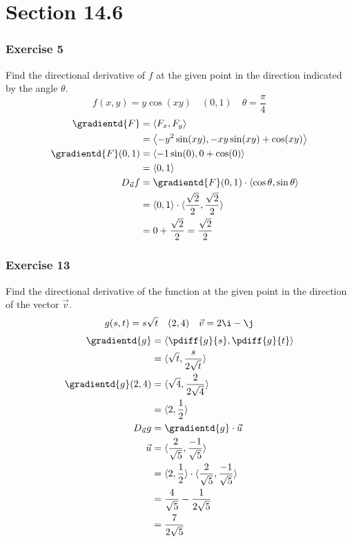 \documentclass{math}
\begin{document}
\section*{Section 14.6}

\subsubsection*{Exercise 5}
Find the directional derivative of \( f \) at the given point in the direction
indicated by the angle \( \theta \).
\[ f(x,y) = y\cos(xy) \quad (0,1) \quad \theta = \frac{\pi}{4} \]
\begin{align*}
  \gradientd{F} &= \langle F_x,F_y\rangle \\
  &= \left\langle -y^2\sin(xy),-xy\sin(xy)+\cos(xy)\right\rangle \\
  \gradientd{F}(0,1) &= \langle-1\sin(0),0+\cos(0)\rangle \\
  &= \langle0,1\rangle \\
  D_{\vec{u}}f &= \gradientd{F}(0,1)\cdot\langle\cos\theta,\sin\theta\rangle \\
  &= \langle0,1\rangle\cdot
    \langle\frac{\sqrt{2}}{2},\frac{\sqrt{2}}{2}\rangle \\
  &= 0+\frac{\sqrt{2}}{2} = \frac{\sqrt{2}}{2}
\end{align*}

\subsubsection*{Exercise 13}
Find the directional derivative of the function at the given point in the
direction of the vector \( \vec{v} \).
\[ g(s,t) = s\sqrt{t} \quad (2,4) \quad \vec{v} = 2\i-\j \]
\begin{align*}
  \gradientd{g} &= \langle\pdiff{g}{s},\pdiff{g}{t}\rangle \\
  &= \langle\sqrt{t},\frac{s}{2\sqrt{t}}\rangle \\
  \gradientd{g}(2,4) &= \langle\sqrt{4},\frac{2}{2\sqrt{4}}\rangle \\
  &= \langle2,\frac{1}{2}\rangle \\
  D_{\vec{u}}g &= \gradientd{g}\cdot\vec{u} \\
  \vec{u} &= \langle\frac{2}{\sqrt{5}},\frac{-1}{\sqrt{5}}\rangle \\
  &= \langle2,\frac{1}{2}\rangle\cdot
    \langle\frac{2}{\sqrt{5}},\frac{-1}{\sqrt{5}}\rangle \\
  &= \frac{4}{\sqrt{5}}-\frac{1}{2\sqrt{5}} \\
  &= \frac{7}{2\sqrt{5}}
\end{align*}
\end{document}
